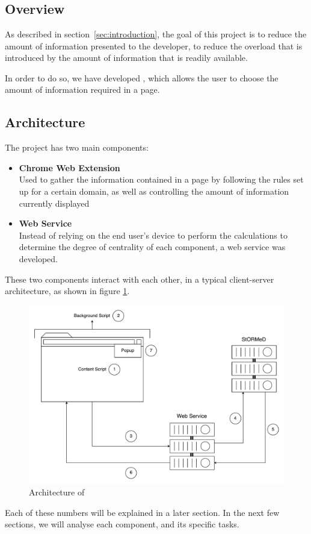\section{\projectName}\label{sec:projectDesign}
\subsection{Overview}
As described in section~\ref{sec:introduction}, the goal of this project is to reduce the amount of information presented to the developer, to reduce the overload that is introduced by the amount of information that is readily available.

In order to do so, we have developed \projectName, which allows the user to choose the amount of information required in a page. 

\subsection{Architecture}
The project has two main components:
\begin{itemize}
\item \textbf{Chrome Web Extension}\\
Used to gather the information contained in a page by following the rules set up for a certain domain, as well as controlling the amount of information currently displayed
\item \textbf{Web Service}\\
Instead of relying on the end user's device to perform the calculations to determine the degree of centrality of each component, a web service was developed.
\end{itemize}

These two components interact with each other, in a typical client-server architecture, as shown in figure \ref{fig:architecture}.
\begin{figure}[H]
\centering
\includegraphics[scale=0.4]{Figures/Architecture}
\caption{Architecture of \projectName}
\label{fig:architecture}
\end{figure}
Each of these numbers will be explained in a later section. In the next few sections, we will analyse each component, and its specific tasks.

